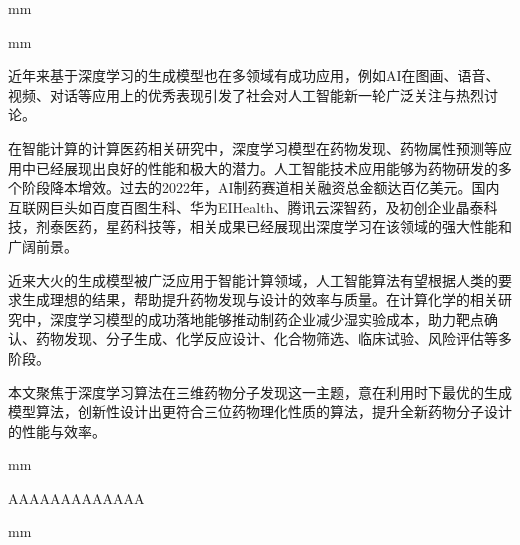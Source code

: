 \frontmatter
{}
\cfoot{\thepage}
\newpage
\begin{center}
\heiti{}
\end{center}
 mm
\begin{center}
\heiti{}
\end{center}
 mm
\begin{spacing}{1.8}
{\sihao 近年来基于深度学习的生成模型也在多领域有成功应用，例如AI在图画、语音、视频、对话等应用上的优秀表现引发了社会对人工智能新一轮广泛关注与热烈讨论。}
\end{spacing}
\begin{spacing}{1.8}
{\sihao 在智能计算的计算医药相关研究中，深度学习模型在药物发现、药物属性预测等应用中已经展现出良好的性能和极大的潜力。人工智能技术应用能够为药物研发的多个阶段降本增效。过去的2022年，AI制药赛道相关融资总金额达百亿美元。国内互联网巨头如百度百图生科、华为EIHealth、腾讯云深智药，及初创企业晶泰科技，剂泰医药，星药科技等，相关成果已经展现出深度学习在该领域的强大性能和广阔前景。}
\end{spacing}
\begin{spacing}{1.8}
{\sihao 近来大火的生成模型被广泛应用于智能计算领域，人工智能算法有望根据人类的要求生成理想的结果，帮助提升药物发现与设计的效率与质量。在计算化学的相关研究中，深度学习模型的成功落地能够推动制药企业减少湿实验成本，助力靶点确认、药物发现、分子生成、化学反应设计、化合物筛选、临床试验、风险评估等多阶段。}
\end{spacing} 
\begin{spacing}{1.8}
{\sihao 本文聚焦于深度学习算法在三维药物分子发现这一主题，意在利用时下最优的生成模型算法，创新性设计出更符合三位药物理化性质的算法，提升全新药物分子设计的性能与效率。}
\end{spacing}
 mm


\newpage                                                                                               %
\begin{spacing}{1.1}
\begin{center}
\heiti{}
\end{center}
\end{spacing}
\vskip 14mm
\begin{center}
\heiti{}
\end{center}
\vskip 7mm

AAAAAAAAAAAAA

 mm
